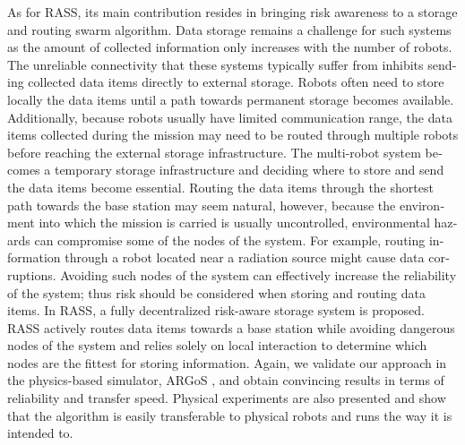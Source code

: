 \begin{otherlanguage}{english}
As for RASS, its main contribution resides in bringing risk awareness to a storage and routing swarm algorithm. Data storage remains a challenge for such systems as the amount of collected information only increases with the number of robots. The unreliable connectivity that these systems typically suffer from \cite{amigoni2017multirobot} inhibits sending collected data items directly to external storage. Robots often need to store locally the data items until a path towards permanent storage becomes available. Additionally, because robots usually have limited communication range, the data items collected during the mission may need to be routed through multiple robots before reaching the external storage infrastructure. The multi-robot system becomes a temporary storage infrastructure and deciding where to store and send the data items become essential. Routing the data items through the shortest path towards the base station may seem natural, however, because the environment into which the mission is carried is usually uncontrolled, environmental hazards can compromise some of the nodes of the system. For example, routing information through a robot located near a radiation source might cause data corruptions. Avoiding such nodes of the system can effectively increase the reliability of the system; thus risk should be considered when storing and routing data items. In RASS, a fully decentralized risk-aware storage system is proposed. RASS actively routes data items towards a base station while avoiding dangerous nodes of the system and relies solely on local interaction to determine which nodes are the fittest for storing information. Again, we validate our approach in the physics-based simulator, ARGoS \cite{Pinciroli:SI2012}, and obtain convincing results in terms of reliability and transfer speed. Physical experiments are also presented and show that the algorithm is easily transferable to physical robots and runs the way it is intended to.
  


\end{otherlanguage}
